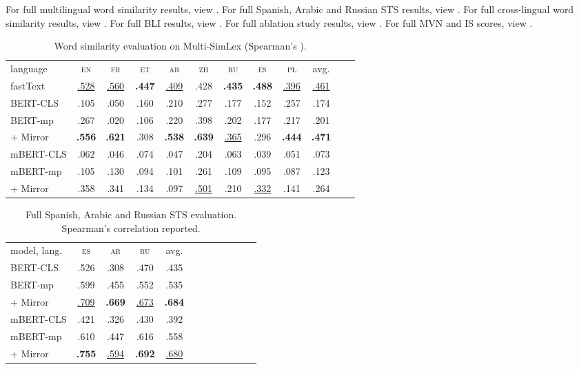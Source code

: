 \documentclass[11pt]{article}
\newcommand{\en}{{\textsc{en}}\xspace}
\newcommand{\es}{{\textsc{es}}\xspace}
\newcommand{\zh}{{\textsc{zh}}\xspace}
\newcommand{\ru}{{\textsc{ru}}\xspace}
\newcommand{\fr}{{\textsc{fr}}\xspace}
\newcommand{\et}{{\textsc{et}}\xspace}
\newcommand{\pl}{{\textsc{pl}}\xspace}
\newcommand{\ar}{{\textsc{ar}}\xspace}
\begin{document}
For full multilingual word similarity results, view . 
For full Spanish, Arabic and Russian STS results, view . For full cross-lingual word similarity results, view . For full BLI results, view . For full ablation study results, view . For full MVN and IS scores, view . 


\begin{table*}[] \centering
\small
\begin{tabular}{lccccccccccc}
\cmidrule[1.0pt]{1-10}
language & \en & \fr & \et & \ar & \zh & \ru & \es & \pl & avg. \\
\cmidrule[1.0pt]{1-10}
fastText & \underline{.528} & \underline{.560} & \textbf{.447} & \underline{.409} & .428 & \textbf{.435} & \textbf{.488} & \underline{.396} & \underline{.461} \\
\cmidrule[1.0pt]{1-10}
BERT-CLS & .105 & .050 &.160 & .210 & .277 & .177 & .152 & .257 & .174 \\
BERT-mp & .267 & .020 &.106 & .220 & .398 & .202 & .177 & .217 & .201 \\
\rowcolor{blue!10}
+ Mirror  & \textbf{.556} & \textbf{.621} & .308 & \textbf{.538} & \textbf{.639} & \underline{.365} & .296 & \textbf{.444} & \textbf{.471} \\
\cmidrule[1.0pt]{1-10}
mBERT-CLS & .062 & .046 & .074 & .047 & .204 & .063 & .039 & .051 & .073 \\
mBERT-mp & .105 & .130 &.094 & .101 & .261 & .109 & .095 & .087 & .123 \\
\rowcolor{blue!10}
+ Mirror & .358 & .341 & .134 & .097 & \underline{.501} & .210 & \underline{.332} & .141 & .264 \\
\cmidrule[1.0pt]{1-10}
\end{tabular}
\caption{Word similarity evaluation on Multi-SimLex (Spearman's ).}
\label{tab:ws_full}
\end{table*}





\begin{table*}[!t]
\centering
\small
\begin{tabular}{lccccccccccc}
\cmidrule[1.0pt]{1-10}
model, lang.  & \es & \ar & \ru & avg. \\
\cmidrule[1.0pt]{1-10}
BERT-CLS & .526 & .308 & .470 & .435 \\
BERT-mp & .599 & .455 & .552 & .535 \\
\rowcolor{blue!10}
+ Mirror & \underline{.709} & \textbf{.669} & \underline{.673} & \textbf{.684} \\
\cmidrule[1.0pt]{1-10}
mBERT-CLS & .421 & .326 & .430 & .392 \\
mBERT-mp & .610 & .447 & .616 & .558 \\
\rowcolor{blue!10}
 + Mirror & \textbf{.755} & \underline{.594} & \textbf{.692} & \underline{.680}\\
\cmidrule[1.0pt]{1-10}
\end{tabular}
\caption{Full Spanish, Arabic and Russian STS evaluation. Spearman's  correlation reported.}
\label{tab:sts_multillingual_full}
\end{table*}
\end{document}
